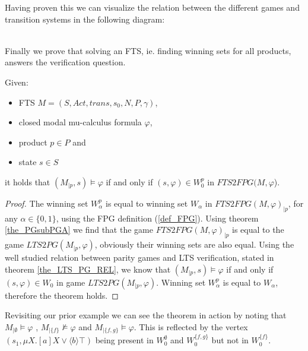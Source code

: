 Having proven this we can visualize the relation between the different games and transition systems in the following diagram:
\\\\
Finally we prove that solving an FTS, ie. finding winning sets for all products, answers the verification question.
\begin{theorem}
	\label{the_FPG_ver_FTS}
	Given:
	\begin{itemize}
		\item FTS $M = (S, Act, trans, s_0, N, P, \gamma)$,
		\item closed modal mu-calculus formula $\varphi$,
		\item product $p \in P$ and
		\item state $s \in S$
	\end{itemize}
	it holds that $(M_{|p}, s) \models \varphi$ if and only if $(s, \varphi) \in W_0^p$ in $\textit{FTS2FPG}(M, \varphi$).
	\begin{proof}
		The winning set $W_\alpha^p$ is equal to winning set $W_\alpha$ in $\textit{FTS2FPG}(M, \varphi)_{|p}$, for any $\alpha \in \{0,1\}$, using the FPG definition (\ref{def_FPG}). Using theorem \ref{the_PGsubPGA} we find that the game $FTS2FPG(M, \varphi)_{|p}$ is equal to the game $LTS2PG(M_{|p}, \varphi)$, obviously their winning sets are also equal. Using the well studied relation between parity games and LTS verification, stated in theorem \ref{the_LTS_PG_REL}, we know that $(M_{|p}, s) \models \varphi$ if and only if $(s, \varphi) \in W_0$ in game $LTS2PG(M_{|p},\varphi)$. Winning set $W_\alpha^p$ is equal to $W_\alpha$, therefore the theorem holds.
	\end{proof}
\end{theorem}

Revisiting our prior example we can see the theorem in action by noting that $M_{|\emptyset} \models \varphi$ , $M_{|\{f\}} \not\models \varphi$ and $M_{|\{f,g\}} \models \varphi$. This is reflected by the vertex $(s_1, \mu X. [a]X \vee \langle b \rangle \top)$ being present in $W_0^\emptyset$ and $W_0^{\{f,g\}}$ but not in $W_0^{\{f\}}$.